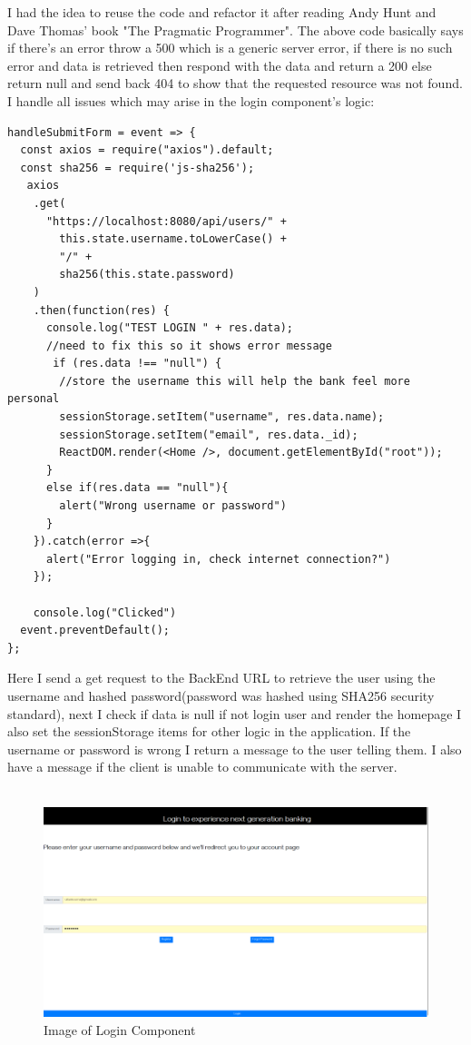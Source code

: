 I had the idea to reuse the code and refactor it after reading Andy Hunt and Dave Thomas' book "The Pragmatic Programmer"\cite{PragmaticProgrammer}.  The above code basically says if there's an error throw a 500 which is a generic server error, if there is no such error and data is retrieved then respond with the data and return a 200 else return null and send back 404 to show that the requested resource was not found.  I handle all issues which may arise in the login component's logic:
\begin{verbatim}
handleSubmitForm = event => {
  const axios = require("axios").default;
  const sha256 = require('js-sha256');
   axios
    .get(
      "https://localhost:8080/api/users/" +
        this.state.username.toLowerCase() +
        "/" +
        sha256(this.state.password)
    )
    .then(function(res) {
      console.log("TEST LOGIN " + res.data);
      //need to fix this so it shows error message
       if (res.data !== "null") {
        //store the username this will help the bank feel more personal
        sessionStorage.setItem("username", res.data.name);
        sessionStorage.setItem("email", res.data._id);
        ReactDOM.render(<Home />, document.getElementById("root"));
      }
      else if(res.data == "null"){
        alert("Wrong username or password")
      }
    }).catch(error =>{
      alert("Error logging in, check internet connection?")
    });

    console.log("Clicked")
  event.preventDefault();
};
\end{verbatim}
Here I send a get request to the BackEnd URL to retrieve the user using the username and
hashed password(password was hashed using SHA256 security standard), next I check if data is null
if not login user and render the homepage I also set the sessionStorage items for other logic in the application.
If the username or password is wrong I return a message to the user telling them.  I also have a message if the
client is unable to communicate with the server.
\\
\\
\begin{figure}[hb]
\includegraphics[width=\textwidth]{img/logincomponent.png}
\caption{Image of Login Component}
\label{fig:Image of login component}
\end{figure}
